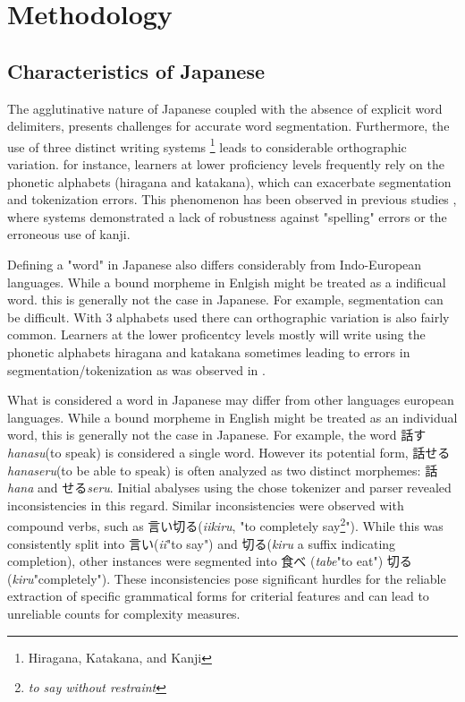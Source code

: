\chapter{Methodology}
\section{Characteristics of Japanese}
The agglutinative nature of Japanese coupled with the absence of explicit word delimiters, presents challenges for
accurate word segmentation. Furthermore, the use of three distinct writing systems
\footnote{Hiragana, Katakana, and Kanji} leads to considerable orthographic variation. for instance, learners at
lower proficiency levels frequently rely on the phonetic alphabets (hiragana and katakana), which can exacerbate
segmentation and tokenization errors. This phenomenon has been observed in previous studies
\citep{yang1998, nagata2009}, where systems demonstrated a lack of robustness against "spelling" errors or the
erroneous use of kanji.

Defining a "word" in Japanese also differs considerably from Indo-European languages. While a bound morpheme in
Enlgish might be treated as a indificual word. this is generally not the case in Japanese. For example,
segmentation can be difficult.
With 3
alphabets used there can orthographic variation is also fairly common. Learners at the lower proficentcy levels
mostly will write using the phonetic alphabets hiragana and katakana sometimes leading to errors in
segmentation/tokenization as was observed in \citep{yang1998, nagata2009}.

What is considered a word in Japanese may differ from other languages european languages. While a bound morpheme in
English might be treated
as an individual word, this is generally not the case in Japanese. For example, the word 話す\textit{hanasu}(to speak)
is considered a single word. However its potential form, 話せる \textit{hanaseru}(to be able to speak) is often analyzed as
two distinct morphemes: 話\textit{hana} and せる\textit{seru}. Initial abalyses using the chose tokenizer and parser
revealed inconsistencies in this regard. Similar inconsistencies were observed with compound verbs, such as
言い切る(\textit{iikiru}, "to completely say\footnote{\textit{to say without restraint}}"). While this was consistently
split into 言い(\textit{ii}"to say") and 切る(\textit{kiru} a suffix indicating completion), other instances were
segmented into
食べ (\textit{tabe}"to eat") 切る(\textit{kiru}"completely"). These inconsistencies pose significant hurdles for the
reliable extraction of specific grammatical forms for criterial features and can lead to unreliable counts for
complexity measures.

